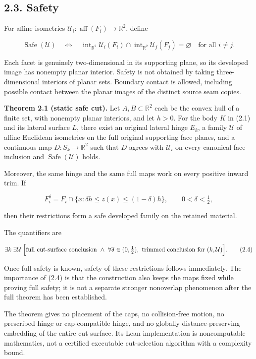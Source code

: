 \documentclass[
  11pt,
  letterpaper,
]{article}
\begin{document}
\subsection{2.3. Safety}\label{safety}

For affine isometries
\(\mathcal U_i:\operatorname{aff}(F_i)\to\mathbb R^2\), define

\[
\operatorname{Safe}(\mathcal U)
\quad\Longleftrightarrow\quad
\operatorname{int}_{\mathbb R^2}\mathcal U_i(F_i)
\cap
\operatorname{int}_{\mathbb R^2}\mathcal U_j(F_j)
=\varnothing
\quad\text{for all }i\ne j.
\tag{2.2}
\]

Each facet is genuinely two-dimensional in its supporting plane, so its
developed image has nonempty planar interior. Safety is not obtained by
taking three-dimensional interiors of planar sets. Boundary contact is
allowed, including possible contact between the planar images of the
distinct source seam copies.

\textbf{Theorem 2.1 (static safe cut).} Let \(A,B\subset\mathbb R^2\)
each be the convex hull of a finite set, with nonempty planar interiors,
and let \(h>0\). For the body \(K\) in (2.1) and its lateral surface
\(L\), there exist an original lateral hinge \(E_k\), a family
\(\mathcal U\) of affine Euclidean isometries on the full original
supporting face planes, and a continuous map \(D:S_k\to\mathbb R^2\)
such that \(D\) agrees with \(\mathcal U_i\) on every canonical face
inclusion and \(\operatorname{Safe}(\mathcal U)\) holds.

Moreover, the same hinge and the same full maps work on every positive
inward trim. If

\[
F_i^{\delta}=F_i\cap\{x:\delta h\le z(x)\le(1-\delta)h\},
\qquad 0<\delta<\tfrac12,
\tag{2.3}
\]

then their restrictions form a safe developed family on the retained
material.

The quantifiers are

\[
\exists k\;\exists\mathcal U\;
\Bigl[\text{full cut-surface conclusion}\ \land\
\forall\delta\in(0,\tfrac12),\ \text{trimmed conclusion for }(k,\mathcal U)\Bigr].
\tag{2.4}
\]

Once full safety is known, safety of these restrictions follows
immediately. The importance of (2.4) is that the construction also keeps
the maps fixed while proving full safety; it is not a separate stronger
nonoverlap phenomenon after the full theorem has been established.

The theorem gives no placement of the caps, no collision-free motion, no
prescribed hinge or cap-compatible hinge, and no globally
distance-preserving embedding of the entire cut surface. Its Lean
implementation is noncomputable mathematics, not a certified executable
cut-selection algorithm with a complexity bound.
\end{document}
